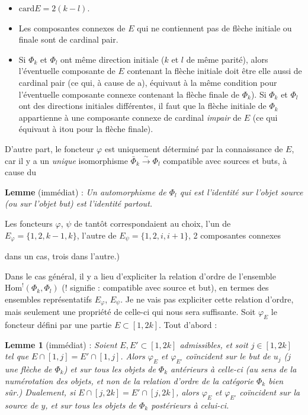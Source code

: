 \documentclass[11pt]{article}
\newcommand{\printedpage}[1]{\marginpar{\footnotesize p.~#1}}
\newcommand{\msp}[1]{\marginpar{\footnotesize [#1]}}
\newcommand{\Hom}{\mathrm{Hom}}
\newcommand{\card}{\mathrm{card}}
\begin{document}
\begin{itemize}
\item[a)] $\card E=2(k-l)$.
\item[b)] Les composantes connexes de $E$ qui ne contiennent pas de flèche initiale ou finale sont de cardinal pair.
\item[c)] Si $\Phi_k$ et $\Phi_l$ ont même direction initiale ($k$ et $l$ de même parité), alors l'éventuelle composante de $E$ contenant la flèche initiale doit être elle aussi de cardinal pair (ce qui, à cause de a), équivaut à la même condition pour l'éventuelle composante connexe contenant la flèche finale de $\Phi_k$). Si $\Phi_k$ et $\Phi_l$ ont des directions initiales différentes, il faut que la flèche initiale de $\Phi_k$ appartienne à une composante connexe de cardinal \textit{impair} de $E$ (ce qui équivaut à itou pour la flèche finale).
\end{itemize}

D'autre part, le foncteur $\varphi$ est uniquement déterminé par la connaissance de $E$, car il y a un \textit{unique} isomorphisme $\bar{\Phi}_k\xrightarrow{\sim}\Phi_l$ compatible avec sources et buts, à cause du

\textbf{Lemme} (immédiat) : \textit{Un automorphisme de $\Phi_l$ qui est l'identité sur l'objet source (ou sur l'objet but) est l'identité partout.}

Les foncteurs $\varphi$, $\psi$ de tantôt correspondaient au choix, l'un de $E_\varphi=\{1,2,k-1,k\}$, l'autre de $E_\psi=\{1,2,i,i+1\}$, 2 composantes connexes

\msp{page 20}
dans un cas, trois dans l'autre.) %


\printedpage{13}

Dans le cas général, il y a lieu d'expliciter la relation d'ordre de l'ensemble $\Hom^{!}(\Phi_k,\Phi_l)$ (! signifie : compatible avec source et but), en termes des ensembles représentatifs $E_\varphi$, $E_\psi$. Je ne vais pas expliciter cette relation d'ordre, mais seulement une propriété de celle-ci qui nous sera suffisante. Soit $\varphi_E$ le foncteur défini par une partie $E\subset[1,2k]$. Tout d'abord :

\textbf{Lemme 1} (immédiat) : \textit{Soient $E,E'\subset[1,2k]$ admissibles, et soit $j\in[1,2k]$ tel que $E\cap[1,j]=E'\cap[1,j]$. Alors $\varphi_E$ et $\varphi_{E'}$ coïncident sur le but de $u_j$ ($j$ une flèche de $\Phi_k$) et sur tous les objets de $\Phi_k$ antérieurs à celle-ci (au sens de la numérotation des objets, et non de la relation d'ordre de la catégorie $\Phi_k$ bien sûr.) Dualement, si $E\cap[j,2k]=E'\cap[j,2k]$, alors $\varphi_E$ et $\varphi_{E'}$ coïncident sur la source de $y$, et sur tous les objets de $\Phi_k$ postérieurs à celui-ci.} %
\end{document}
